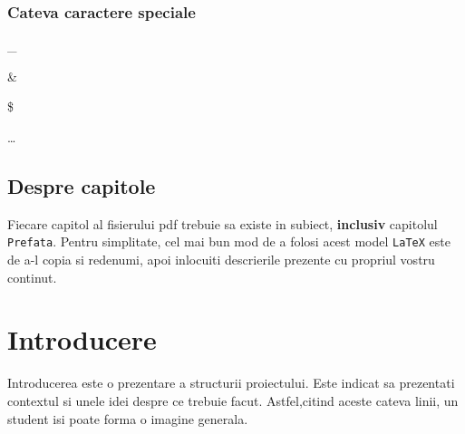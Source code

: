 \documentclass{42-en}
\begin{document}
        \newpage


        \subsection{Cateva caractere speciale}

            \begin{description}\itemsep1pt
                \item [Underscore :] \_
                \item [Ampersand :] \&
                \item [Dollar :] \$
                \item [Elipsis :] \dots
            \end{description}


    \section{Despre capitole}

    Fiecare capitol al fisierului pdf trebuie sa existe in subiect,
    \textbf{inclusiv} capitolul \texttt{Prefata}. Pentru simplitate,
    cel mai bun mod de a folosi acest model \texttt{LaTeX} este de 
    a-l copia si redenumi, apoi inlocuiti descrierile prezente
    cu propriul vostru continut.\\


\chapter{Introducere}

    Introducerea este o prezentare a structurii proiectului. Este indicat
    sa prezentati contextul si unele idei despre ce trebuie facut.
    Astfel,citind aceste cateva linii, un student isi poate forma o imagine generala.
\end{document}
